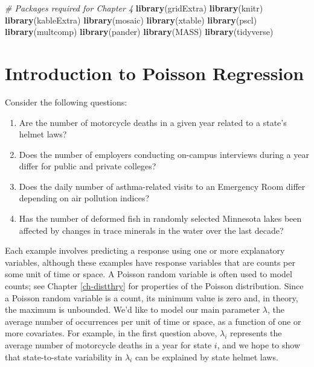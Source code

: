 \documentclass[
]{krantz}
\newenvironment{Shaded}{\begin{snugshade}}{\end{snugshade}}
\newcommand{\CommentTok}[1]{\textcolor[rgb]{0.37,0.37,0.37}{\textit{#1}}}
\newcommand{\FunctionTok}[1]{\textcolor[rgb]{0.27,0.27,0.27}{\textbf{#1}}}
\newcommand{\NormalTok}[1]{#1}
\providecommand{\tightlist}{%
  \setlength{\itemsep}{0pt}\setlength{\parskip}{0pt}}
\begin{document}
\begin{Shaded}
\begin{Highlighting}[]
\CommentTok{\# Packages required for Chapter 4}
\FunctionTok{library}\NormalTok{(gridExtra)}
\FunctionTok{library}\NormalTok{(knitr)}
\FunctionTok{library}\NormalTok{(kableExtra)}
\FunctionTok{library}\NormalTok{(mosaic)}
\FunctionTok{library}\NormalTok{(xtable)}
\FunctionTok{library}\NormalTok{(pscl) }
\FunctionTok{library}\NormalTok{(multcomp)}
\FunctionTok{library}\NormalTok{(pander)}
\FunctionTok{library}\NormalTok{(MASS)}
\FunctionTok{library}\NormalTok{(tidyverse)}
\end{Highlighting}
\end{Shaded}

\section{Introduction to Poisson Regression}\label{introduction-to-poisson-regression}

Consider the following questions:

\begin{enumerate}
\def\labelenumi{\arabic{enumi}.}
\tightlist
\item
  Are the number of motorcycle deaths in a given year related to a state's helmet laws?
\item
  Does the number of employers conducting on-campus interviews during a year differ for public and private colleges?
\item
  Does the daily number of asthma-related visits to an Emergency Room differ depending on air pollution indices?
\item
  Has the number of deformed fish in randomly selected Minnesota lakes been affected by changes in trace minerals in the water over the last decade?
\end{enumerate}

Each example involves predicting a response using one or more explanatory variables, although these examples have response variables that are counts per some unit of time or space. A Poisson random variable is often used to model counts; see Chapter \ref{ch-distthry} for properties of the Poisson distribution. Since a Poisson random variable is a count, its minimum value is zero and, in theory, the maximum is unbounded. We'd like to model our main parameter \(\lambda\), the average number of occurrences per unit of time or space, as a function of one or more covariates. For example, in the first question above, \(\lambda_i\) represents the average number of motorcycle deaths in a year for state \(i\), and we hope to show that state-to-state variability in \(\lambda_i\) can be explained by state helmet laws.
\end{document}
